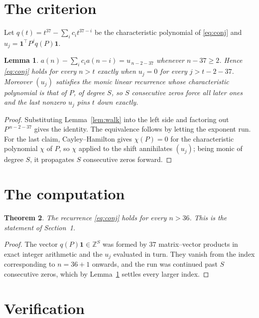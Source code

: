 \documentclass[11pt,a4paper]{article}
\theoremstyle{plain}
\newtheorem{theorem}{Theorem}
\newtheorem{lemma}[theorem]{Lemma}
\theoremstyle{definition}
\begin{document}
\section{The criterion}

Let $q(t)=t^{37}-\sum_i c_i t^{37-i}$ be the characteristic polynomial of
\eqref{eq:conj} and $u_j=\mathbf{1}^{\!\top}P^{j}q(P)\mathbf{1}$.

\begin{lemma}\label{lem:crit}
$a(n)-\sum_i c_i a(n-i)=u_{\,n-2-37}$ whenever $n-37\ge2$. Hence
\eqref{eq:conj} holds for every $n>t$ exactly when $u_j=0$ for every
$j>t-2-37$. Moreover $(u_j)$ satisfies the monic linear recurrence whose
characteristic polynomial is that of $P$, of degree $S$, so $S$ consecutive zeros force all
later ones and the last nonzero $u_j$ pins $t$ down exactly.
\end{lemma}

\begin{proof}
Substituting Lemma~\ref{lem:walk} into the left side and factoring out
$P^{\,n-2-37}$ gives the identity. The equivalence follows by letting the exponent
run. For the last claim, Cayley--Hamilton gives $\chi(P)=0$ for the characteristic
polynomial $\chi$ of $P$, so $\chi$ applied to the shift annihilates $(u_j)$; being monic of
degree $S$, it propagates $S$ consecutive zeros forward.
\end{proof}

\section{The computation}

\begin{theorem}
The recurrence \eqref{eq:conj} holds for every $n>36$. This is the statement of
Section~1.
\end{theorem}

\begin{proof}
The vector $q(P)\mathbf{1}\in\mathbb{Z}^{S}$ was formed by $37$ matrix--vector
products in exact integer arithmetic and the $u_j$ evaluated in turn. They vanish from the
index corresponding to $n=36+1$ onwards, and the run was continued past $S$ consecutive
zeros, which by Lemma~\ref{lem:crit} settles every larger index.
\end{proof}

\section{Verification}
\end{document}
